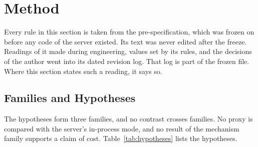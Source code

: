 \section{Method}\label{sec:method}

Every rule in this section is taken from the pre-specification, which was frozen on
\FrozenDate{} before any code of the server existed. Its text was never edited after the freeze.
Readings of it made during engineering, values set by its rules, and the decisions of the author
went into its dated revision log. That log is part of the frozen file.
Where this section states such a reading, it says so.

\subsection{Families and Hypotheses}\label{sec:hypotheses}

The hypotheses form three families, and no contrast crosses families. No proxy is compared with
the server's in-process mode, and no result of the mechanism family supports a claim of cost.
Table~\ref{tab:hypotheses} lists the hypotheses.

